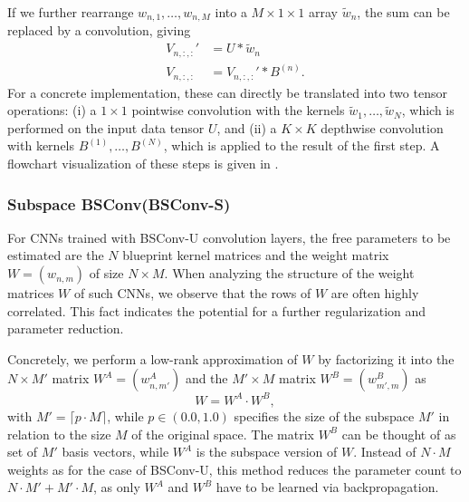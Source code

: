 \documentclass[10pt,twocolumn,letterpaper]{article}
\newcommand{\DCCK}{BSConv\xspace}
\newcommand{\DCCKU}{\DCCK-U\xspace}
\newcommand{\DCCKS}{\DCCK-S\xspace}
\newcommand{\tensorIn}{U}
\newcommand{\tensorOut}{V}
\newcommand{\blueprint}[1]{B^{(#1)}}
\newcommand{\weight}{w}
\newcommand{\weightArray}{\tilde{w}}
\newcommand{\weightA}{w^A}
\newcommand{\weightB}{w^B}
\newcommand{\weightMatrix}{W}
\newcommand{\weightMatrixA}{W^A}
\newcommand{\weightMatrixB}{W^B}
\newcommand{\spatialK}{K}
\newcommand{\channelInCount}{M}
\newcommand{\channelInIndex}{m}
\newcommand{\channelOutCount}{N}
\newcommand{\channelOutIndex}{n}
\begin{document}
If we further rearrange $\weight_{\channelOutIndex, 1}, \dots, \weight_{\channelOutIndex, \channelInCount}$ into a $\channelInCount \times 1 \times 1$ array $\weightArray_{\channelOutIndex}$, the sum can be replaced by a convolution, giving
\begin{align}
	\tensorOut_{\channelOutIndex, :, :}' & = \tensorIn * \weightArray_{\channelOutIndex} \label{eq:dcckV1Pointwise} \\
	\tensorOut_{\channelOutIndex, :, :}  & = \tensorOut_{\channelOutIndex, :, :}' * \blueprint{\channelOutIndex}. \label{eq:dcckV1Depthwise}
\end{align}
For a concrete implementation, these  can directly be translated into two tensor operations:
(i) a $1 \times 1$ pointwise convolution with the kernels $\weightArray_{1}, \dots, \weightArray_{\channelOutCount}$, which is performed on the input data tensor $\tensorIn$, and
(ii) a $\spatialK \times \spatialK$ depthwise convolution \cite{howard2017mobilenets,ioffe2015batch} with kernels $\blueprint{1}, \dots, \blueprint{\channelOutCount}$, which is applied to the result of the first step.
A flowchart visualization of these steps is given in .

\subsubsection{Subspace \DCCK (\DCCKS)}
\label{subsubsec:dcckS}
For CNNs trained with \DCCKU convolution layers, the free parameters to be estimated are the $\channelOutCount$ blueprint kernel matrices and the weight matrix $\weightMatrix = (\weight_{\channelOutIndex, \channelInIndex})$ of size $\channelOutCount \times \channelInCount$.
When analyzing the structure of the weight matrices $\weightMatrix$ of such CNNs, we observe that the rows of $\weightMatrix$ are often highly correlated.
This fact indicates the potential for a further regularization and parameter reduction.

Concretely, we perform a low-rank approximation of $\weightMatrix$ by factorizing it into the $\channelOutCount \times \channelInCount'$ matrix $\weightMatrixA = (\weightA_{\channelOutIndex, \channelInIndex'})$ and the $\channelInCount' \times \channelInCount$ matrix $\weightMatrixB = (\weightB_{\channelInIndex', \channelInIndex})$ as
\begin{equation}
	\weightMatrix = \weightMatrixA \cdot \weightMatrixB,
\end{equation}
with $\channelInCount' = \lceil p \cdot \channelInCount \rceil$, while $p \in (0.0, 1.0)$ specifies the size of the subspace $\channelInCount'$ in relation to the size $\channelInCount$ of the original space.
The matrix $\weightMatrixB$ can be thought of as set of $\channelInCount'$ basis vectors, while $\weightMatrixA$ is the subspace version of $\weightMatrix$.
Instead of $\channelOutCount \cdot \channelInCount$ weights as for the case of \DCCKU, this method reduces the parameter count to $\channelOutCount \cdot \channelInCount' + \channelInCount' \cdot \channelInCount$, as only $\weightMatrixA$ and $\weightMatrixB$ have to be learned via backpropagation.
\end{document}
